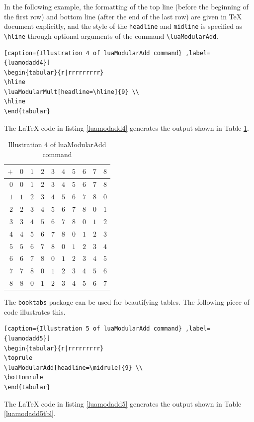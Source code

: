 ﻿\documentclass{article}
\begin{document}
In the following example, the formatting of the top line (before the beginning of the first row) and bottom line (after the end of the last row) are given in TeX document explicitly, and the style of the \verb|headline| and \verb|midline| is specified as \verb|\hline| through optional arguments of the command \verb|\luaModularAdd|.
\begin{lstlisting}[caption={Illustration 4 of luaModularAdd command} ,label={luamodadd4}]
\begin{tabular}{r|rrrrrrrrr}
\hline
\luaModularMult[headline=\hline]{9} \\
\hline
\end{tabular}
\end{lstlisting}
The LaTeX code in listing \ref{luamodadd4} generates the output shown in Table  \ref{luamodadd4tbl}.
\begin{table}[H]
\centering
\begin{tabular}{r|rrrrrrrrr}
\hline
$+$ & $0$ & $1$ & $2$ & $3$ & $4$ & $5$ & $6$ & $7$ & $8$\\
\hline $0$ & $0$ & $1$ & $2$ & $3$ & $4$ & $5$ & $6$ & $7$ & $8$\\
 $1$ & $1$ & $2$ & $3$ & $4$ & $5$ & $6$ & $7$ & $8$ & $0$\\
 $2$ & $2$ & $3$ & $4$ & $5$ & $6$ & $7$ & $8$ & $0$ & $1$\\
 $3$ & $3$ & $4$ & $5$ & $6$ & $7$ & $8$ & $0$ & $1$ & $2$\\
$4$ & $4$ & $5$ & $6$ & $7$ & $8$ & $0$ & $1$ & $2$ & $3$\\
$5$ & $5$ & $6$ & $7$ & $8$ & $0$ & $1$ & $2$ & $3$ & $4$\\
$6$ & $6$ & $7$ & $8$ & $0$ & $1$ & $2$ & $3$ & $4$ & $5$\\
 $7$ & $7$ & $8$ & $0$ & $1$ & $2$ & $3$ & $4$ & $5$ & $6$\\
$8$ & $8$ & $0$ & $1$ & $2$ & $3$ & $4$ & $5$ & $6$ & $7$ \\
\hline
\end{tabular} 
\caption{Illustration 4 of luaModularAdd command}
\label{luamodadd4tbl}
\end{table}

The \verb|booktabs| package can be used for beautifying tables. The following piece of code illustrates this.
\begin{lstlisting}[caption={Illustration 5 of luaModularAdd command} ,label={luamodadd5}]
\begin{tabular}{r|rrrrrrrrr}
\toprule
\luaModularAdd[headline=\midrule]{9} \\
\bottomrule
\end{tabular}
\end{lstlisting}
The LaTeX code in listing \ref{luamodadd5} generates the output shown in Table  \ref{luamodadd5tbl}.
\end{document}
